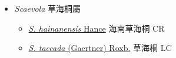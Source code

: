 
  \begin{itemize}
 \item[] \textit{Scaevola} 草海桐屬
                                
  \begin{itemize}
        \item[] \href{http://www.theplantlist.org/tpl1.1/search?q=Scaevola+hainanensis}{\textit{S. hainanensis} Hance}   海南草海桐   CR
        \item[] \href{http://www.theplantlist.org/tpl1.1/search?q=Scaevola+taccada}{\textit{S. taccada} (Gaertner) Roxb.}   草海桐   LC
  \end{itemize}
  \end{itemize}
